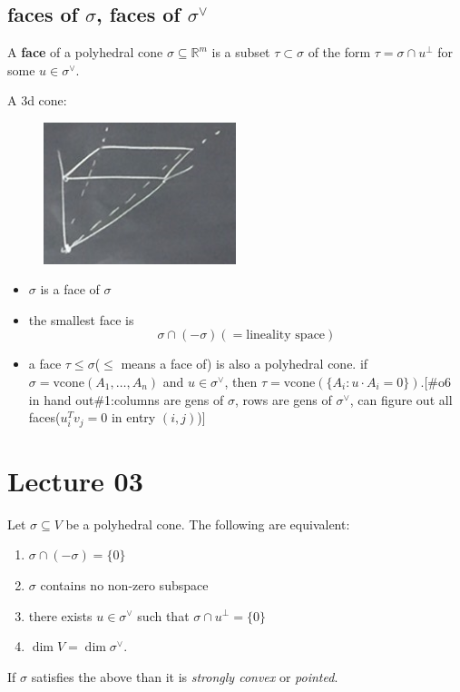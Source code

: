 \documentclass[a4paper,12pt]{amsart}
\newcommand{\RR}{\mathbb{R}}
\begin{document}
\subsection{faces of $\sigma$, faces of $\sigma^{\vee}$}
\begin{Def}
A \textbf{face} of a polyhedral cone $\sigma\subseteq\RR^m$ is a subset $\tau\subset\sigma$ of the form $\tau=\sigma\cap u^{\perp}$ for some $u\in\sigma^{\vee}$.
\end{Def}
\begin{Eg}A 3d cone:
\begin{figure}[h]
	\centering
	\includegraphics[width=0.5\textwidth]{pic/lec02pic01}
\end{figure}
\end{Eg}
\begin{Remark}
\begin{itemize}
\item $\sigma$ is a face of $\sigma$
\item the smallest face is
\begin{equation*}
\sigma\cap(-\sigma)(=\text{lineality space})
\end{equation*}
\item a face $\tau\leq\sigma$($\leq$ means a face of) is also a polyhedral cone. if $\sigma=\text{vcone}(A_1,\dots, A_n)$ and $u\in\sigma^{\vee}$, then $\tau=\text{vcone}(\{A_i:u\cdot A_i=0\})$.[\#o6 in hand out\#1:columns are gens of $\sigma$, rows are gens of $\sigma^{\vee}$, can figure out all faces($u_i^Tv_j=0$ in entry $(i,j)$)]
\end{itemize}
\end{Remark}

\newpage
\section{Lecture 03}

\begin{Def}
Let $\sigma \subseteq V$ be a polyhedral cone.
The following are equivalent:
\begin{enumerate}
\item $\sigma \cap (-\sigma) = \{0\}$
\item $\sigma$ contains no non-zero subspace
\item there exists $u \in \sigma^\vee$ such that $\sigma \cap u^\perp = \{0\}$
\item $\dim V = \dim \sigma^\vee$.
\end{enumerate}
If $\sigma$ satisfies the above than it is \emph{strongly convex} or \emph{pointed}.
\end{Def}
\end{document}
